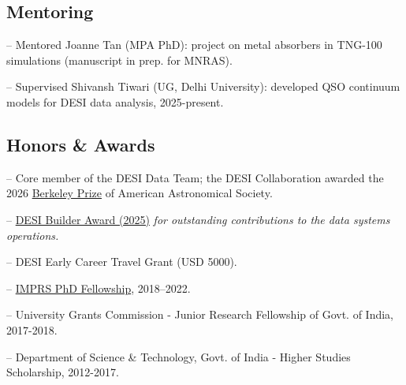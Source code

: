 \documentclass[12pt,letterpaper]{article}
\begin{document}
\subsection{Mentoring}
  \vspace{-1mm}
\begin{list}{}{\cvlist}
\item -- Mentored Joanne Tan (MPA PhD): project on metal absorbers in TNG-100 simulations (manuscript in prep. for MNRAS).
\item -- Supervised Shivansh Tiwari (UG, Delhi University): developed QSO continuum models for DESI data analysis, 2025-present.
\end{list}
  \vspace{-2mm}
\subsection{Honors \& Awards}

\begin{list}{}{\cvlist}
\item -- Core member of the DESI Data Team; the DESI Collaboration awarded the 2026 \href{https://aas.org/press/desi-collaboration-receive-2026-berkeley-prize}{Berkeley Prize} of American Astronomical Society.
  \item -- \href{https://www.desi.lbl.gov/collaboration/desi-builders/}{DESI Builder Award (2025)} \textit{for outstanding contributions to the data systems operations.}
  \item --  DESI Early Career Travel Grant (USD 5000).
  \item -- \href{https://www.imprs-astro.mpg.de/content/student-class-2018-2021.html}{IMPRS PhD Fellowship}, 2018--2022.
  \item -- University Grants Commission - Junior Research Fellowship of Govt. of India, 2017-2018.
  \item -- Department of Science \& Technology, Govt. of India -  Higher Studies Scholarship, 2012-2017.
\end{list}
\end{document}
